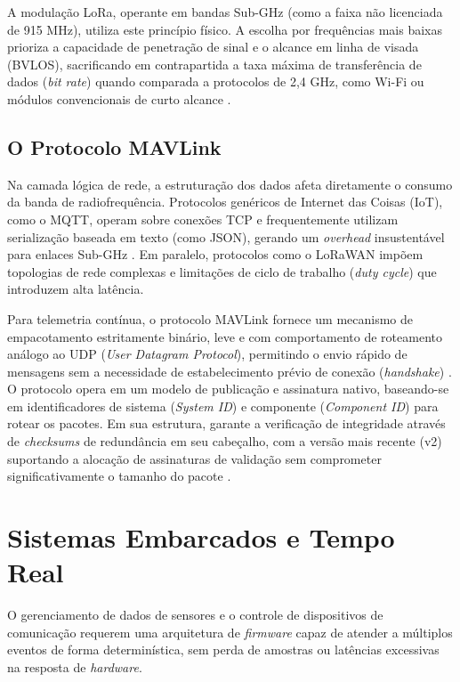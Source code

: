 A modulação LoRa, operante em bandas Sub-GHz (como a faixa não licenciada de 915 MHz), utiliza este princípio físico. A escolha por frequências mais baixas prioriza a capacidade de penetração de sinal e o alcance em linha de visada (BVLOS), sacrificando em contrapartida a taxa máxima de transferência de dados (\textit{bit rate}) quando comparada a protocolos de 2,4 GHz, como Wi-Fi ou módulos convencionais de curto alcance \cite{haykin_communication}.

\subsection{O Protocolo MAVLink}

Na camada lógica de rede, a estruturação dos dados afeta diretamente o consumo da banda de radiofrequência. Protocolos genéricos de Internet das Coisas (IoT), como o MQTT, operam sobre conexões TCP e frequentemente utilizam serialização baseada em texto (como JSON), gerando um \textit{overhead} insustentável para enlaces Sub-GHz \cite{oasis2019mqtt}. Em paralelo, protocolos como o LoRaWAN impõem topologias de rede complexas e limitações de ciclo de trabalho (\textit{duty cycle}) que introduzem alta latência.

Para telemetria contínua, o protocolo MAVLink fornece um mecanismo de empacotamento estritamente binário, leve e com comportamento de roteamento análogo ao UDP (\textit{User Datagram Protocol}), permitindo o envio rápido de mensagens sem a necessidade de estabelecimento prévio de conexão (\textit{handshake}) \cite{mavlink_dev_guide}. O protocolo opera em um modelo de publicação e assinatura nativo, baseando-se em identificadores de sistema (\textit{System ID}) e componente (\textit{Component ID}) para rotear os pacotes. Em sua estrutura, garante a verificação de integridade através de \textit{checksums} de redundância em seu cabeçalho, com a versão mais recente (v2) suportando a alocação de assinaturas de validação sem comprometer significativamente o tamanho do pacote \cite{mavlink_dev_guide}.

\section{Sistemas Embarcados e Tempo Real}

O gerenciamento de dados de sensores e o controle de dispositivos de comunicação requerem uma arquitetura de \textit{firmware} capaz de atender a múltiplos eventos de forma determinística, sem perda de amostras ou latências excessivas na resposta de \textit{hardware}.


